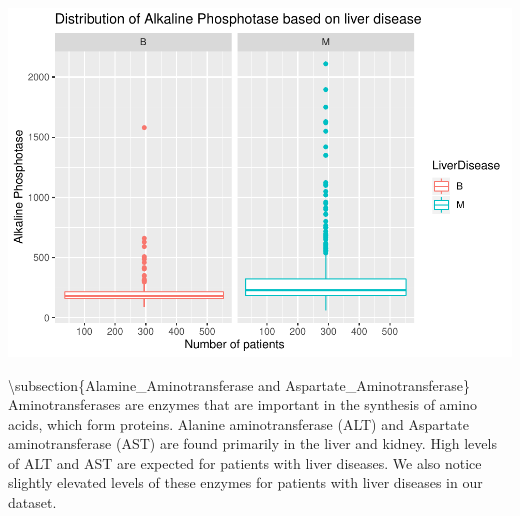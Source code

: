 \documentclass[]{article}
\newenvironment{Shaded}{\begin{snugshade}}{\end{snugshade}}
\newcommand{\CommentTok}[1]{\textcolor[rgb]{0.56,0.35,0.01}{\textit{#1}}}
\newcommand{\DataTypeTok}[1]{\textcolor[rgb]{0.13,0.29,0.53}{#1}}
\newcommand{\KeywordTok}[1]{\textcolor[rgb]{0.13,0.29,0.53}{\textbf{#1}}}
\newcommand{\NormalTok}[1]{#1}
\newcommand{\OperatorTok}[1]{\textcolor[rgb]{0.81,0.36,0.00}{\textbf{#1}}}
\newcommand{\StringTok}[1]{\textcolor[rgb]{0.31,0.60,0.02}{#1}}
\begin{document}
\includegraphics{LiverDisease_files/figure-latex/unnamed-chunk-17-1.pdf}

\textbackslash subsection\{Alamine\_Aminotransferase and
Aspartate\_Aminotransferase\} Aminotransferases are enzymes that are
important in the synthesis of amino acids, which form proteins. Alanine
aminotransferase (ALT) and Aspartate aminotransferase (AST) are found
primarily in the liver and kidney. High levels of ALT and AST are
expected for patients with liver diseases. We also notice slightly
elevated levels of these enzymes for patients with liver diseases in our
dataset.

\begin{Shaded}
\end{Shaded}
\end{document}

